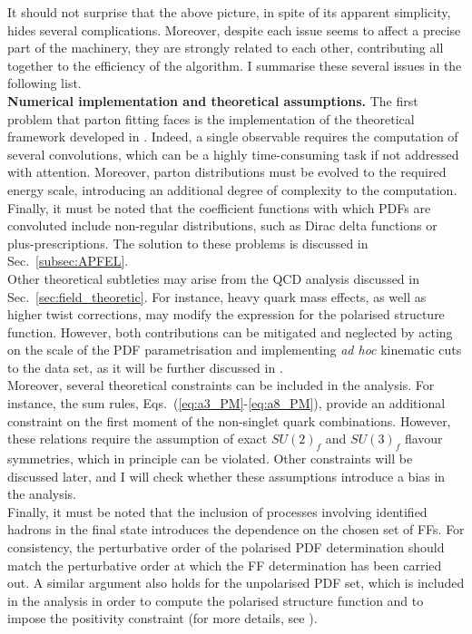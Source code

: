 It should not surprise that the above picture, in spite of its apparent simplicity, hides several complications. Moreover, despite each issue seems to  affect a precise part of the machinery, they are strongly related to each other, contributing all together to the efficiency of the algorithm. I summarise these several issues in the following list.\\[10pt]
\begingroup
\textbf{Numerical implementation and theoretical assumptions.} The first problem that parton fitting faces is the implementation of the theoretical framework developed in . Indeed, a single observable requires the computation of several convolutions, which can be a highly time-consuming task if not addressed with attention. Moreover, parton distributions must be evolved to the required energy scale, introducing an additional degree of complexity to the computation. Finally, it must be noted that the coefficient functions with which PDFs are convoluted include non-regular distributions, such as Dirac delta functions or plus-prescriptions. The solution to these problems is discussed in Sec.~\ref{subsec:APFEL}.
\\[6pt]
Other theoretical subtleties may arise from the QCD analysis discussed in Sec.~\ref{sec:field_theoretic}. For instance, heavy quark mass effects, as well as higher twist corrections, may modify the expression for the polarised structure function. However, both contributions can be mitigated and neglected by acting on the scale of the PDF parametrisation and implementing \textit{ad hoc} kinematic cuts to the data set, as it will be further discussed in .
\\[6pt]
Moreover, several theoretical constraints can be included in the analysis. For instance, the sum rules, Eqs.~(\ref{eq:a3_PM}-\ref{eq:a8_PM}), provide an additional constraint on the first moment of the non-singlet quark combinations. However, these relations require the assumption of exact $SU(2)_f$ and $SU(3)_f$ flavour symmetries, which in principle can be violated. Other constraints will be discussed later, and I will check whether these assumptions introduce a bias in the analysis.
\\[6pt]
Finally, it must be noted that the inclusion of processes involving identified hadrons in the final state introduces the dependence on the chosen set of FFs. For consistency, the perturbative order of the polarised PDF determination should match the perturbative order at which the FF determination has been carried out. A similar argument also holds for the unpolarised PDF set, which is included in the analysis in order to compute the polarised structure function and to impose the positivity constraint (for more details, see ).
